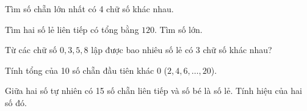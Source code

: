 \begin{ex} %
Tìm số chẵn lớn nhất có 4 chữ số khác nhau.
\end{ex}

\begin{ex} %
Tìm hai số lẻ liên tiếp có tổng bằng $120$. Tìm số lớn.
\end{ex}

\begin{ex} %
Từ các chữ số $0, 3, 5, 8$ lập được bao nhiêu số lẻ có 3 chữ số khác nhau?
\end{ex}

\begin{ex} %
Tính tổng của 10 số chẵn đầu tiên khác 0 ($2, 4, 6, \dots, 20$).
\end{ex}

\begin{ex} %
Giữa hai số tự nhiên có 15 số chẵn liên tiếp và số bé là số lẻ. Tính hiệu của hai số đó.
\end{ex}
